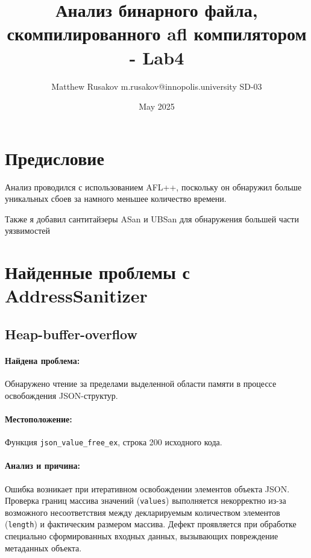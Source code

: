 \usepackage[russian]{babel}
\usepackage{geometry}
\usepackage{graphicx}
\usepackage{hyperref}
\usepackage{listings}
\usepackage{color}
\usepackage[T1]{fontenc}
\usepackage[utf8]{inputenc}

\title{Анализ бинарного файла, скомпилированного afl компилятором - Lab4}
\author{Matthew Rusakov m.rusakov@innopolis.university SD-03}
\date{May 2025}



    \maketitle


    \section{Предисловие}
    Анализ проводился с использованием AFL++, поскольку он обнаружил больше уникальных сбоев за намного меньшее количество времени.

    Также я добавил сантитайзеры ASan и UBSan для обнаружения большей части уязвимостей


    \section{Найденные проблемы с AddressSanitizer}

    \subsection{Heap-buffer-overflow}

    \paragraph{Найдена проблема:}
    Обнаружено чтение за пределами выделенной области памяти в процессе освобождения JSON-структур.

    \paragraph{Местоположение:} Функция \texttt{json\_value\_free\_ex}, строка 200 исходного кода.

    \paragraph{Анализ и причина:} Ошибка возникает при итеративном освобождении элементов объекта JSON. Проверка границ массива значений (\texttt{values}) выполняется некорректно из-за возможного несоответствия между декларируемым количеством элементов (\texttt{length}) и фактическим размером массива. Дефект проявляется при обработке специально сформированных входных данных, вызывающих повреждение метаданных объекта.

